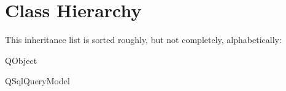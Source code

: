 \section{Class Hierarchy}
This inheritance list is sorted roughly, but not completely, alphabetically\+:\begin{DoxyCompactList}
\item Q\+Object\begin{DoxyCompactList}
\item {}
\end{DoxyCompactList}
\item Q\+Sql\+Query\+Model\begin{DoxyCompactList}
\item {}
\item {}
\item {}
\end{DoxyCompactList}
\end{DoxyCompactList}
